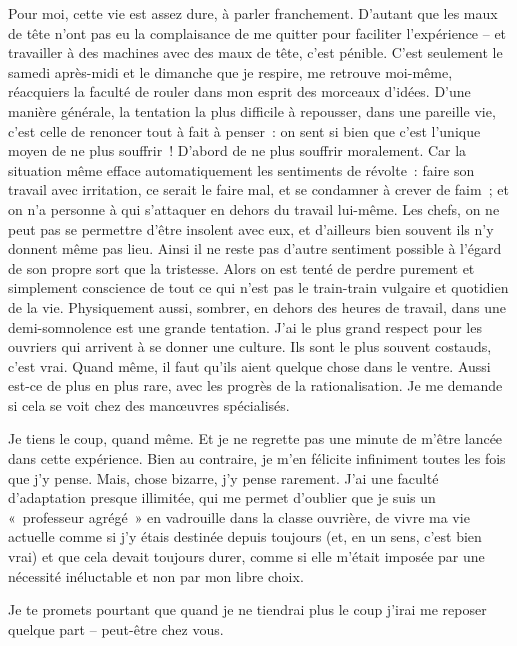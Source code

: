 \documentclass[french,twoside]{book} %
\begin{document}
Pour moi, cette vie est assez dure, à parler franchement. D'autant que les maux de tête n'ont pas eu la complaisance de me quitter pour faciliter l'expérience – et travailler à des machines avec des maux de tête, c'est pénible. C'est seulement le samedi après-midi et le dimanche que je respire, me retrouve moi-même, réacquiers la faculté de rouler dans mon esprit des morceaux d'idées. D'une manière générale, la tentation la plus difficile à repousser, dans une pareille vie, c'est celle de renoncer tout à fait à penser : on sent si bien que c'est l'unique moyen de ne plus souffrir ! D'abord de ne plus souffrir moralement. Car la situation même efface automatiquement les sentiments de révolte : faire son travail avec irritation, ce serait le faire mal, et se condamner à crever de faim ; et on n'a personne à qui s'attaquer en dehors du travail lui-même. Les chefs, on ne peut pas se permettre d'être insolent avec eux, et d'ailleurs bien souvent ils n'y donnent même pas lieu. Ainsi il ne reste pas d'autre sentiment possible à l'égard de son propre sort que la tristesse. Alors on est tenté de perdre purement et simplement conscience de tout ce qui n'est pas le train-train vulgaire et quotidien de la vie. Physiquement aussi, sombrer, en dehors des heures de travail, dans une demi-somnolence est une grande tentation. J'ai le plus grand respect pour les ouvriers qui arrivent à se donner une culture. Ils sont le plus souvent costauds, c'est vrai. Quand même, il faut qu'ils aient quelque chose dans le ventre. Aussi est-ce de plus en plus rare, avec les progrès de la rationalisation. Je me demande si cela se voit chez des manœuvres spécialisés.\par
Je tiens le coup, quand même. Et je ne regrette pas une minute de m'être lancée dans cette expérience. Bien au contraire, je m'en félicite infiniment toutes les fois que j'y pense. Mais, chose bizarre, j'y pense rarement. J'ai une faculté d'adaptation presque illimitée, qui me permet d'oublier que je suis un « professeur agrégé » en vadrouille dans la classe ouvrière, de vivre ma vie actuelle comme si j'y étais destinée depuis toujours (et, en un sens, c'est bien vrai) et que cela devait toujours durer, comme si elle m'était imposée par une nécessité inéluctable et non par mon libre choix.\par
Je te promets pourtant que quand je ne tiendrai plus le coup j'irai me reposer quelque part – peut-être chez vous.\par
\end{document}
